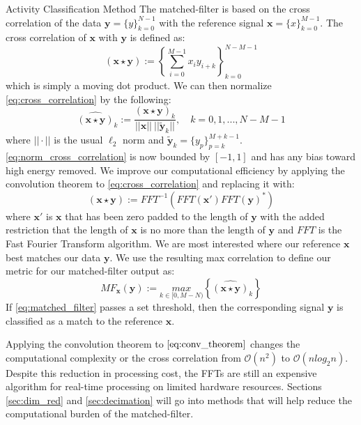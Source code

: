 \documentclass[unknownkeysallowed,final]{beamer}
\begin{document}
\begin{frame}{}
\begin{textblock}{19.5}
\begin{block}{\small{Activity Classification Method}}
The matched-filter is based on the cross correlation of the data $\textbf{y} = \{y\}_{k=0}^{N-1}$ with the reference signal $\textbf{x} = \{x\}_{k=0}^{M-1}$.
The cross correlation of $\textbf{x}$ with $\textbf{y}$ is defined as:
%
\begin{equation} \label{eq:cross_correlation}
(\textbf{x} \star \textbf{y}) := \left \{\sum_{i=0}^{M-1}x_{i} y_{i+k} \right \}_{k=0}^{N-M-1}
\end{equation}
%
which is simply a moving dot product.
We can then normalize \eqref{eq:cross_correlation} by the following:
%
\begin{equation} \label{eq:norm_cross_correlation}
\widehat{(\textbf{x} \star \textbf{y})}_k := \frac{(\textbf{x} \star \textbf{y})_k}{||\textbf{x}|| \ || \widetilde{\textbf{y}}_k || }, \quad k = 0,1,...,N-M-1
\end{equation}
%
where $|| \cdot ||$ is the usual $\ell_2$ norm and $\widetilde{\textbf{y}}_k = \{y_p\}_{p=k}^{M+k-1}$.
\eqref{eq:norm_cross_correlation} is now bounded by $[-1,1]$ and has any bias toward high energy removed.
We improve our computational efficiency by applying the convolution theorem to \eqref{eq:cross_correlation} and replacing it with:
%
\begin{equation} \label{eq:conv_theorem}
(\textbf{x} \star \textbf{y}) := FFT^{-1}(FFT(\textbf{x}') FFT(\textbf{y})^*)
\end{equation}
%
where $\textbf{x}'$ is $\textbf{x}$ that has been zero padded to the length of $\textbf{y}$ with the added restriction that the length of $\textbf{x}$ is no more than the length of $\textbf{y}$ and $FFT$ is the Fast Fourier Transform algorithm.
We are most interested where our reference $\textbf{x}$ best matches our data $\textbf{y}$.
We use the resulting max correlation to define our metric for  our matched-filter output as:
%
\begin{equation} \label{eq:matched_filter}
MF_{\textbf{x}}(\textbf{y}) := \underset{k \in [0, M-N)}{max} \left \{\widehat{(\textbf{x} \star \textbf{y})}_k \right \}
\end{equation}
%
If \eqref{eq:matched_filter} passes a set threshold, then the corresponding signal $\textbf{y}$ is classified as a match to the reference $\textbf{x}$.

Applying the convolution theorem to $\eqref{eq:conv_theorem}$ changes the computational complexity or the cross correlation from $\mathcal{O}(n^2)$ to $\mathcal{O}(n log_2n)$.
Despite this reduction in processing cost, the FFTs are still an expensive algorithm for real-time processing on limited hardware resources.
Sections \ref{sec:dim_red} and \ref{sec:decimation} will go into methods that will help reduce the computational burden of the matched-filter.
\end{block}
\end{textblock}


\end{frame}
\end{document}
